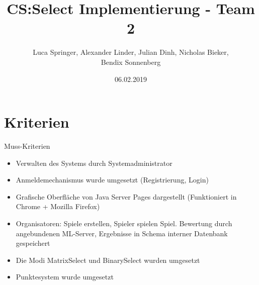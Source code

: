 \documentclass[xcolor=dvipsnames]{beamer}
\title[Team 2 - Implementierung]{CS:Select Implementierung - Team 2}
\author{Luca Springer, Alexander Linder, Julian Dinh, Nicholas Bieker,\\ Bendix Sonnenberg}
\date{06.02.2019}
\begin{document}
\begin{frame} %
  \titlepage
\end{frame}

\section{Kriterien}

\begin{frame}{Muss-Kriterien}
  \begin{itemize}
    \item Verwalten des Systems durch Systemadministrator \\
    \item Anmeldemechanismus wurde umgesetzt (Registrierung, Login) \\
    \item Grafische Oberfläche von Java Server Pages dargestellt (Funktioniert in Chrome + Mozilla Firefox) \\
    \item Organisatoren: Spiele erstellen, Spieler spielen Spiel. Bewertung durch angebundenen ML-Server, Ergebnisse in Schema interner Datenbank gespeichert \\
    \item Die Modi MatrixSelect und BinarySelect wurden umgesetzt \\
    \item Punktesystem wurde umgesetzt \\
  \end{itemize}
\end{frame}
\end{document}
